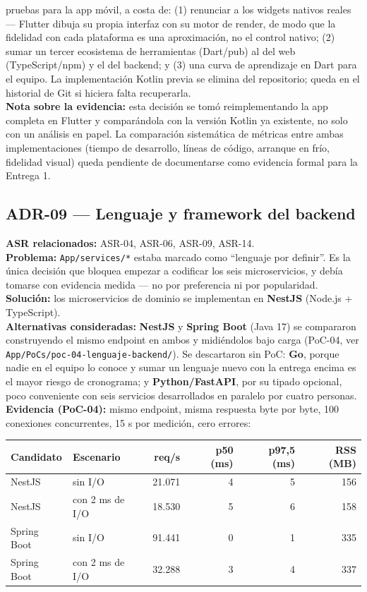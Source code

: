 \documentclass[11pt,a4paper]{article}
\begin{document}
pruebas para la app móvil, a costa de: (1) renunciar a los widgets nativos reales --- Flutter dibuja
su propia interfaz con su motor de render, de modo que la fidelidad con cada plataforma es una
aproximación, no el control nativo; (2) sumar un tercer ecosistema de herramientas (Dart/pub) al del
web (TypeScript/npm) y el del backend; y (3) una curva de aprendizaje en Dart para el equipo. La
implementación Kotlin previa se elimina del repositorio; queda en el historial de Git si hiciera falta
recuperarla.\\
\textbf{Nota sobre la evidencia:} esta decisión se tomó reimplementando la app completa en Flutter y
comparándola con la versión Kotlin ya existente, no solo con un análisis en papel. La comparación
sistemática de métricas entre ambas implementaciones (tiempo de desarrollo, líneas de código,
arranque en frío, fidelidad visual) queda pendiente de documentarse como evidencia formal para la
Entrega 1.

\subsection*{ADR-09 --- Lenguaje y framework del backend}
\textbf{ASR relacionados:} ASR-04, ASR-06, ASR-09, ASR-14.\\
\textbf{Problema:} \texttt{App/services/*} estaba marcado como ``lenguaje por definir''. Es la única
decisión que bloquea empezar a codificar los seis microservicios, y debía tomarse con evidencia
medida --- no por preferencia ni por popularidad.\\
\textbf{Solución:} los microservicios de dominio se implementan en \textbf{NestJS} (Node.js +
TypeScript).\\
\textbf{Alternativas consideradas:} \textbf{NestJS} y \textbf{Spring Boot} (Java 17) se compararon
construyendo el mismo endpoint en ambos y midiéndolos bajo carga (PoC-04, ver
\texttt{App/PoCs/poc-04-lenguaje-backend/}). Se descartaron sin PoC: \textbf{Go}, porque nadie en el
equipo lo conoce y sumar un lenguaje nuevo con la entrega encima es el mayor riesgo de cronograma; y
\textbf{Python/FastAPI}, por su tipado opcional, poco conveniente con seis servicios desarrollados en
paralelo por cuatro personas.\\
\textbf{Evidencia (PoC-04):} mismo endpoint, misma respuesta byte por byte, 100 conexiones
concurrentes, 15 s por medición, cero errores:

\begin{center}
\begin{tabular}{llrrrr}
\toprule
\textbf{Candidato} & \textbf{Escenario} & \textbf{req/s} & \textbf{p50 (ms)} & \textbf{p97,5 (ms)} &
\textbf{RSS (MB)}\\
\midrule
NestJS & sin I/O & 21.071 & 4 & 5 & 156\\
NestJS & con 2 ms de I/O & 18.530 & 5 & 6 & 158\\
Spring Boot & sin I/O & 91.441 & 0 & 1 & 335\\
Spring Boot & con 2 ms de I/O & 32.288 & 3 & 4 & 337\\
\bottomrule
\end{tabular}
\end{center}
\end{document}
